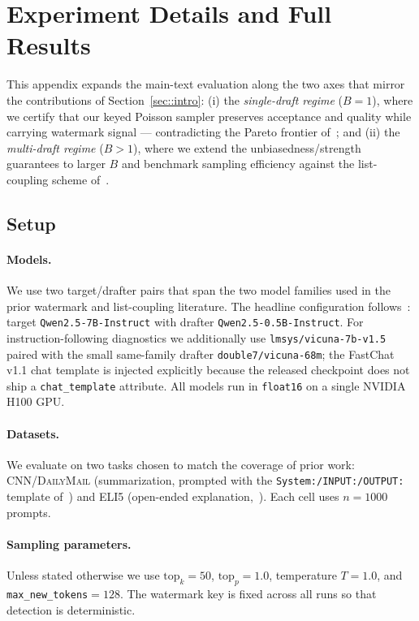 \section{Experiment Details and Full Results}
\label{app::experiments}

This appendix expands the main-text evaluation along the two axes that mirror
the contributions of Section~\ref{sec::intro}:
(i) the \emph{single-draft regime} ($B{=}1$), where we certify that our keyed
Poisson sampler preserves acceptance and quality while carrying watermark
signal --- contradicting the Pareto frontier of~\citet{hu2024inevitable}; and
(ii) the \emph{multi-draft regime} ($B{>}1$), where we extend the
unbiasedness/strength guarantees to larger $B$ and benchmark sampling
efficiency against the list-coupling scheme of~\citet{rowan2025list}.

\subsection{Setup}
\label{app:setup}

\paragraph{Models.}
We use two target/drafter pairs that span the two model families used in the
prior watermark and list-coupling literature.
The headline configuration follows~\citet{rowan2025list}: target
\texttt{Qwen2.5-7B-Instruct} with drafter \texttt{Qwen2.5-0.5B-Instruct}.
For instruction-following diagnostics we additionally use
\texttt{lmsys/vicuna-7b-v1.5} paired with the small same-family drafter
\texttt{double7/vicuna-68m}; the FastChat v1.1 chat template is injected
explicitly because the released checkpoint does not ship a
\texttt{chat\_template} attribute.
All models run in \texttt{float16} on a single NVIDIA H100 GPU.

\paragraph{Datasets.}
We evaluate on two tasks chosen to match the coverage of prior work:
\textsc{CNN/DailyMail} (summarization, prompted with the
\texttt{System:/INPUT:/OUTPUT:} template of~\citet{hu2024inevitable}) and
\textsc{ELI5} (open-ended explanation,~\citet{fan2019eli5}).
Each cell uses $n{=}1000$ prompts.

\paragraph{Sampling parameters.}
Unless stated otherwise we use $\mathrm{top}_k{=}50$, $\mathrm{top}_p{=}1.0$,
temperature $T{=}1.0$, and \texttt{max\_new\_tokens}${=}128$.
The watermark key is fixed across all runs so that detection is deterministic.


